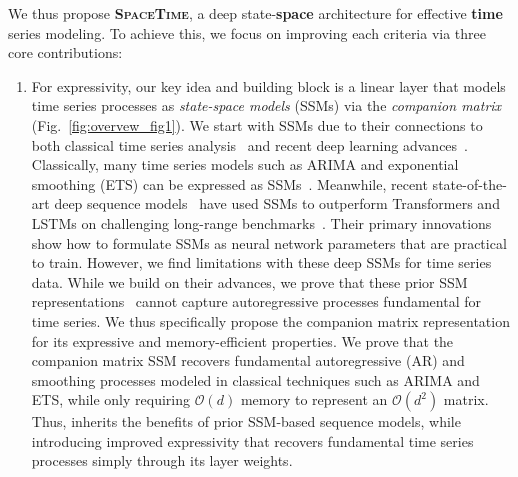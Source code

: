 %
%



We thus propose \textbf{\textsc{SpaceTime}}, a deep state-\textbf{space} architecture for effective \textbf{time} series modeling. 
To achieve this,
we focus on improving each criteria via three core contributions:

\begin{enumerate}[topsep=0pt,leftmargin=*]
    \item For expressivity, our key idea and building block is a linear layer that models time series processes as \emph{state-space models} (SSMs) via the \emph{companion matrix} (Fig.~\ref{fig:overvew_fig1}). 
    We start with SSMs due to their connections to both classical time series analysis~\citep{kalman1960new, hamilton1994state} and recent deep learning advances~\citep{gu2021efficiently}. Classically, many time series models such as ARIMA and exponential smoothing (ETS) can be expressed as SSMs~\citep{box1970time, winters1960forecasting}. 
    Meanwhile, recent state-of-the-art deep sequence models~\citep{gu2021efficiently} have used SSMs to outperform Transformers and LSTMs on challenging long-range benchmarks~\citep{tay2020long}.
    Their primary innovations show how to formulate SSMs as neural network parameters that are practical to train. However, we find limitations with these deep SSMs for time series data. While we build on their advances, we prove that these prior SSM representations~\citep{ gu2021combining, gu2021efficiently, gupta2022diagonal}
    cannot capture autoregressive processes fundamental for time series. We thus specifically propose the companion matrix representation for its expressive and memory-efficient properties. 
    We prove that the companion matrix SSM recovers fundamental autoregressive (AR) and smoothing processes modeled in classical techniques such as ARIMA and ETS, while only requiring $\mathcal{O}(d)$ memory to represent an $\mathcal{O}(d^2)$ matrix. 
    Thus, \ourmethod{} inherits the benefits of prior SSM-based sequence models, while introducing improved expressivity that 
    recovers fundamental time series processes
    simply through its layer weights. 
    

\end{enumerate}
